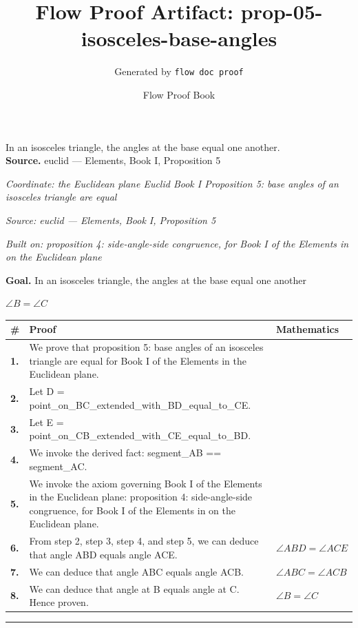 \documentclass[11pt]{article}
\title{Flow Proof Artifact: prop-05-isosceles-base-angles}
\author{Generated by \texttt{flow doc proof}}
\date{Flow Proof Book}
\theoremstyle{definition}
\begin{document}
\maketitle
In an isosceles triangle, the angles at the base equal one another.\\[0.5em]
\textbf{Source.} euclid — Elements, Book I, Proposition 5\\[0.5em]
\bigskip
{}\par
\smallskip\noindent\textit{Coordinate: the Euclidean plane \cdot Euclid Book I \cdot Proposition 5: base angles of an isosceles triangle are equal}\par
\smallskip\noindent\textit{Source: euclid — Elements, Book I, Proposition 5}\par
\smallskip\noindent\textit{Built on: proposition 4: side-angle-side congruence, for Book I of the Elements in on the Euclidean plane}\par
\medskip
\noindent\textbf{Goal.} In an isosceles triangle, the angles at the base equal one another\par
\noindent$\displaystyle \angle B = \angle C$\par
\medskip
\noindent
\begin{tabular}{@{} >{\raggedright\arraybackslash}p{} >{\raggedright\arraybackslash}p{} >{\raggedleft\arraybackslash}p{} @{}}
\textbf{\#} & \textbf{Proof} & \textbf{Mathematics} \\
\midrule
\textbf{1.} & We prove that proposition 5: base angles of an isosceles triangle are equal for Book I of the Elements in the Euclidean plane. & \\[0.45em]
\textbf{2.} & Let D = point\_on\_BC\_extended\_with\_BD\_equal\_to\_CE. & \\[0.45em]
\textbf{3.} & Let E = point\_on\_CB\_extended\_with\_CE\_equal\_to\_BD. & \\[0.45em]
\textbf{4.} & We invoke the derived fact: segment\_AB == segment\_AC. & \\[0.45em]
\textbf{5.} & We invoke the axiom governing Book I of the Elements in the Euclidean plane: proposition 4: side-angle-side congruence, for Book I of the Elements in on the Euclidean plane. & \\[0.45em]
\textbf{6.} & From step 2, step 3, step 4, and step 5, we can deduce that angle ABD equals angle ACE. & $\displaystyle \angle ABD = \angle ACE$ \\[0.45em]
\textbf{7.} & We can deduce that angle ABC equals angle ACB. & $\displaystyle \angle ABC = \angle ACB$ \\[0.45em]
\textbf{8.} & We can deduce that angle at B equals angle at C. Hence proven. & $\displaystyle \angle B = \angle C$ \\[0.45em]
\bottomrule
\end{tabular}
\label{thm:Geometry-Euclid Book I-proposition_5_base_angles_of_an_isosceles_triangle_are_equal}
\par\medskip\hrule
\end{document}

